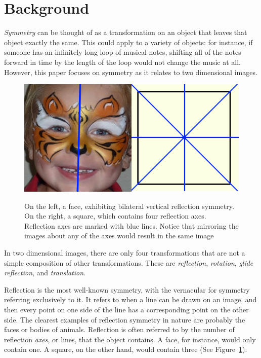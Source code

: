 \section{Background}
\textit{Symmetry} can be thought of as a transformation on an object that leaves that object exactly the same. This could apply to a variety of objects: for instance, if someone has an infinitely long loop of musical notes, shifting all of the notes forward in time by the length of the loop would not change the music at all. However, this paper focuses on symmetry as it relates to two dimensional images.

\begin{figure}
\centering
\includegraphics[width=0.9\columnwidth]{reflection}
\label{ref}
\caption{On the left, a face, exhibiting bilateral vertical reflection symmetry. On the right, a square, which contains four reflection axes. Reflection axes are marked with blue lines. Notice that mirroring the images about any of the axes would result in the same image}
\end{figure}

In two dimensional images, there are only four transformations that are not a simple composition of other transformations. These are \textit{reflection}, \textit{rotation}, \textit{glide reflection}, and \textit{translation}.

Reflection is the most well-known symmetry, with the vernacular for symmetry referring exclusively to it. It refers to when a line can be drawn on an image, and then every point on one side of the line has a corresponding point on the other side. The clearest examples of reflection symmetry in nature are probably the faces or bodies of animals. Reflection is often referred to by the number of reflection \textit{axes}, or lines, that the object contains. A face, for instance, would only contain one. A square, on the other hand, would contain three (See Figure~\ref{ref}).


